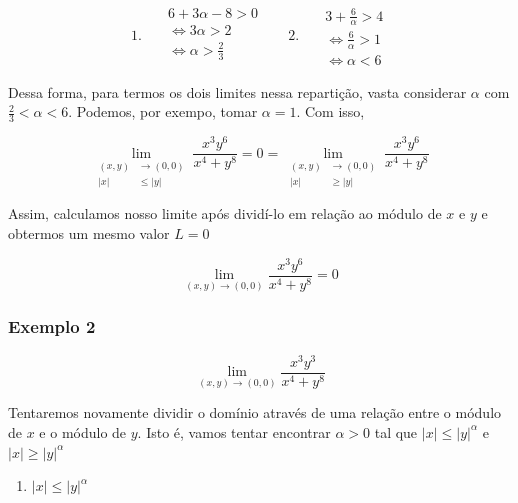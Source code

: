 \documentclass[
  portuguese,
  letterpaper,
  DIV=11,
  numbers=noendperiod]{scrreport}
\providecommand{\tightlist}{%
  \setlength{\itemsep}{0pt}\setlength{\parskip}{0pt}}
\begin{document}
\[
1. ~~~
\begin{aligned}
  &6 + 3\alpha - 8 > 0 \\
  &\Leftrightarrow 3\alpha > 2 \\
  &\Leftrightarrow \alpha > \frac{2}{3} \\
\end{aligned} ~~~~~~~~
2. ~~~
\begin{aligned}
  &3 + \frac{6}{\alpha} > 4 \\
  &\Leftrightarrow \frac{6}{\alpha} > 1 \\
  &\Leftrightarrow \alpha < 6
\end{aligned}
\]

Dessa forma, para termos os dois limites nessa repartição, vasta
considerar \(\alpha\) com \(\frac{2}{3}<\alpha<6\). Podemos, por exempo,
tomar \(\alpha = 1\). Com isso,

\[
\lim_{\begin{aligned}
(x,y)&\rightarrow(0,0)\\ \lvert x \rvert &\leq \lvert y \rvert
\end{aligned}}
\frac{x^3y^6}{x^4+y^8} = 0 =
\lim_{\begin{aligned}
(x,y)&\rightarrow(0,0)\\ \lvert x \rvert &\geq \lvert y \rvert
\end{aligned}}
\frac{x^3y^6}{x^4+y^8}
\]

Assim, calculamos nosso limite após dividí-lo em relação ao módulo de
\(x\) e \(y\) e obtermos um mesmo valor \(L=0\)

\[
\lim_{(x,y)\rightarrow(0,0)}
\frac{x^3y^6}{x^4+y^8} = 0
\]

\subsubsection{Exemplo 2}\label{exemplo-2}

\[
\lim_{(x,y)\rightarrow (0,0)} \frac{x^3y^3}{x^4+y^8}
\]

Tentaremos novamente dividir o domínio através de uma relação entre o
módulo de \(x\) e o módulo de \(y\). Isto é, vamos tentar encontrar
\(\alpha>0\) tal que \(\lvert x \rvert \leq \lvert y \rvert^{\alpha}\) e
\(\lvert x \rvert \geq \lvert y \rvert^{\alpha}\)

\begin{enumerate}
\def\labelenumi{\arabic{enumi}.}
\tightlist
\item
  \(\lvert x \rvert \leq \lvert y \rvert^{\alpha}\)
\end{enumerate}
\end{document}

